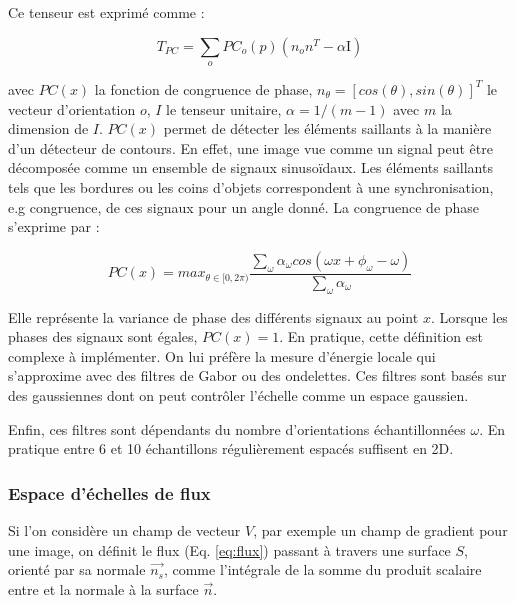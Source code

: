 Ce tenseur est exprimé comme :

\begin{equation}
  T_{PC} = \sum_o PC_{o}(p)(n_{o}n^T - \alpha \text{I})
\end{equation}

avec $PC(x)$ la fonction de congruence de phase, $n_{\theta}=[cos(\theta),sin(\theta)]^T$ le vecteur d'orientation $o$, $I$ le tenseur unitaire, $\alpha = 1/(m-1)$ avec $m$ la dimension de $I$. $PC(x)$ permet de détecter les éléments saillants à la manière d'un détecteur de contours.
En effet, une image vue comme un signal peut être décomposée comme un ensemble de signaux sinusoïdaux. Les éléments saillants tels que les bordures ou les coins d'objets correspondent à une synchronisation, e.g congruence, de ces signaux pour un angle donné. La congruence de phase s'exprime par :

\begin{equation}
  PC(x) = max_{\theta \in [0,2\pi)}  \frac{\sum_\omega \alpha_{\omega}cos(\omega x + \phi_{\omega} - \omega)  }{\sum_\omega \alpha_{\omega} }
\end{equation}

Elle représente la variance de phase des différents signaux au point $x$. Lorsque les phases des signaux sont égales, $PC(x)=1$.
En pratique, cette définition est complexe à implémenter. On lui préfère la mesure d'énergie locale qui s'approxime avec des filtres de Gabor ou des ondelettes. Ces filtres sont basés sur des gaussiennes dont on peut contrôler l'échelle comme un espace gaussien.

Enfin, ces filtres sont dépendants du nombre d'orientations échantillonnées $\omega$. En pratique entre 6 et 10 échantillons régulièrement espacés suffisent en 2D. 


\subsubsection{Espace d'échelles de flux}
  \label{sec:EA:rehaussement:echelle:flux}
  
  
  Si l'on considère un champ de vecteur $V$, par exemple un champ de gradient pour une image, on définit le flux (Eq. \ref{eq:flux}) passant à travers une surface $S$, orienté par sa normale $\vec{n_s}$, comme l'intégrale de la somme du produit scalaire entre  et la normale à la surface $\vec{n}$.
  

